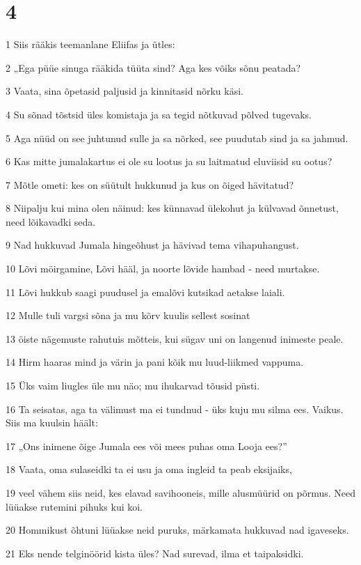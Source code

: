 \chapter{4}

\par 1 Siis rääkis teemanlane Eliifas ja ütles:
\par 2 „Ega püüe sinuga rääkida tüüta sind? Aga kes võiks sõnu peatada?
\par 3 Vaata, sina õpetasid paljusid ja kinnitasid nõrku käsi.
\par 4 Su sõnad tõstsid üles komistaja ja sa tegid nõtkuvad põlved tugevaks.
\par 5 Aga nüüd on see juhtunud sulle ja sa nõrked, see puudutab sind ja sa jahmud.
\par 6 Kas mitte jumalakartus ei ole su lootus ja su laitmatud eluviisid su ootus?
\par 7 Mõtle ometi: kes on süütult hukkunud ja kus on õiged hävitatud?
\par 8 Niipalju kui mina olen näinud: kes künnavad ülekohut ja külvavad õnnetust, need lõikavadki seda.
\par 9 Nad hukkuvad Jumala hingeõhust ja hävivad tema vihapuhangust.
\par 10 Lõvi möirgamine, Lõvi hääl, ja noorte lõvide hambad - need murtakse.
\par 11 Lõvi hukkub saagi puudusel ja emalõvi kutsikad aetakse laiali.
\par 12 Mulle tuli vargsi sõna ja mu kõrv kuulis sellest sosinat
\par 13 öiste nägemuste rahutuis mõtteis, kui sügav uni on langenud inimeste peale.
\par 14 Hirm haaras mind ja värin ja pani kõik mu luud-liikmed vappuma.
\par 15 Üks vaim liugles üle mu näo; mu ihukarvad tõusid püsti.
\par 16 Ta seisatas, aga ta välimust ma ei tundnud - üks kuju mu silma ees. Vaikus. Siis ma kuulsin häält:
\par 17 „Ons inimene õige Jumala ees või mees puhas oma Looja ees?”
\par 18 Vaata, oma sulaseidki ta ei usu ja oma ingleid ta peab eksijaiks,
\par 19 veel vähem siis neid, kes elavad savihooneis, mille alusmüürid on põrmus. Need lüüakse rutemini pihuks kui koi.
\par 20 Hommikust õhtuni lüüakse neid puruks, märkamata hukkuvad nad igaveseks.
\par 21 Eks nende telginöörid kista üles? Nad surevad, ilma et taipaksidki.

